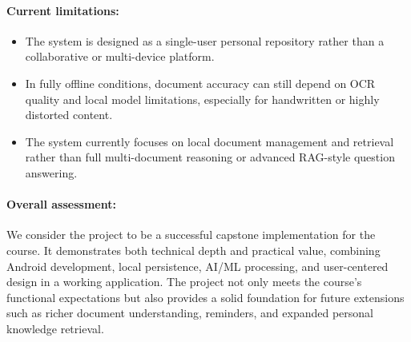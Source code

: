 \paragraph{Current limitations:}
\begin{itemize}
    \item The system is designed as a single-user personal repository rather than a collaborative or multi-device platform.
    \item In fully offline conditions, document accuracy can still depend on OCR quality and local model limitations, especially for handwritten or highly distorted content.
    \item The system currently focuses on local document management and retrieval rather than full multi-document reasoning or advanced RAG-style question answering.
\end{itemize}

\paragraph{Overall assessment:}
We consider the project to be a successful capstone implementation for the course. It demonstrates both technical depth and practical value, combining Android development, local persistence, AI/ML processing, and user-centered design in a working application. The project not only meets the course's functional expectations but also provides a solid foundation for future extensions such as richer document understanding, reminders, and expanded personal knowledge retrieval.
